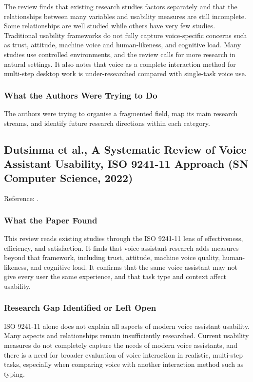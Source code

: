 \documentclass[11pt,a4paper]{report}
\begin{document}
The review finds that existing research studies factors separately and
that the relationships between many variables and usability measures
are still incomplete. Some relationships are well studied while others
have very few studies. Traditional usability frameworks do not fully
capture voice-specific concerns such as trust, attitude, machine voice
and human-likeness, and cognitive load. Many studies use controlled
environments, and the review calls for more research in natural
settings. It also notes that voice as a complete interaction method for
multi-step desktop work is under-researched compared with single-task
voice use.

\subsubsection{What the Authors Were Trying to Do}

The authors were trying to organise a fragmented field, map its main
research streams, and identify future research directions within each
category.

\subsection{Dutsinma et al., A Systematic Review of Voice Assistant
Usability, ISO 9241-11 Approach (SN Computer Science, 2022)}

\noindent Reference: \autocite{dutsinma2022vareview}.

\subsubsection{What the Paper Found}

This review reads existing studies through the ISO 9241-11 lens of
effectiveness, efficiency, and satisfaction. It finds that voice
assistant research adds measures beyond that framework, including
trust, attitude, machine voice quality, human-likeness, and cognitive
load. It confirms that the same voice assistant may not give every user
the same experience, and that task type and context affect usability.

\subsubsection{Research Gap Identified or Left Open}

ISO 9241-11 alone does not explain all aspects of modern voice
assistant usability. Many aspects and relationships remain
insufficiently researched. Current usability measures do not completely
capture the needs of modern voice assistants, and there is a need for
broader evaluation of voice interaction in realistic, multi-step tasks,
especially when comparing voice with another interaction method such as
typing.
\end{document}
